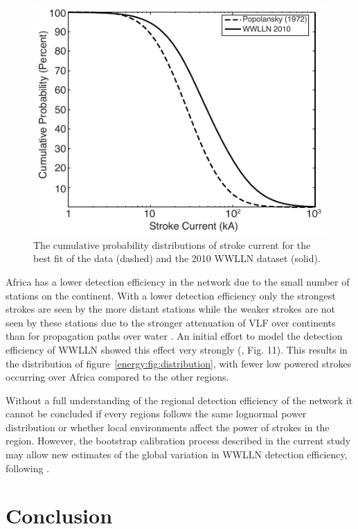 \begin{figure}[ht!]
\centering
\includegraphics[scale=1]{energy/Figures/PPS_CDF.pdf}
\caption{The cumulative probability distributions of stroke current for the best fit of the \citet{Popolansky1972} data (dashed) and the 2010 WWLLN dataset (solid).}
\label{energy:fig:PPS_CDF}
\end{figure}

Africa has a lower detection efficiency in the network due to the small number of stations on the continent.
With a lower detection efficiency only the strongest strokes are seen by the more distant stations while the weaker strokes are not seen by these stations due to the stronger attenuation of VLF over continents than for propagation paths over water \citep{Wait1970}.
An initial effort to model the detection efficiency of WWLLN showed this effect very strongly (\citet{Rodger2006}, Fig. 11).
This results in the distribution of figure~\ref{energy:fig:distribution}, with fewer low powered strokes occurring over Africa compared to the other regions.

Without a full understanding of the regional detection efficiency of the network it cannot be concluded if every regions follows the same lognormal power distribution or whether local environments affect the power of strokes in the region.
However, the bootstrap calibration process described in the current study may allow new estimates of the global variation in WWLLN detection efficiency, following \citet{Rodger2006}.

\section{Conclusion}

